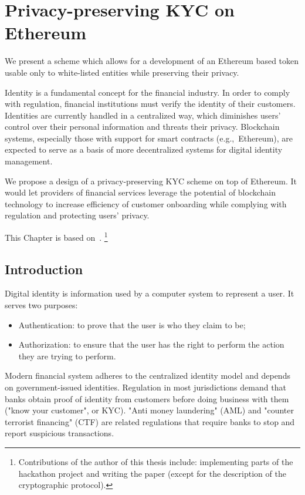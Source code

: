 \chapter{Privacy-preserving KYC on Ethereum}

\label{Chapter12KYC}

We present a scheme which allows for a development of an Ethereum based token usable only to white-listed entities while preserving their privacy.

Identity is a fundamental concept for the financial industry.
In order to comply with regulation, financial institutions must verify the identity of their customers.
Identities are currently handled in a centralized way, which diminishes users' control over their personal information and threats their privacy.
Blockchain systems, especially those with support for smart contracts (e.g.,~Ethereum), are expected to serve as a basis of more decentralized systems for digital identity management.

We propose a design of a privacy-preserving KYC scheme on top of Ethereum.
It would let providers of financial services leverage the potential of blockchain technology to increase efficiency of customer onboarding while complying with regulation and protecting users' privacy.

This Chapter is based on~\cite{Biryukov2018}.
\footnote{Contributions of the author of this thesis include: implementing parts of the hackathon project and writing the paper (except for the description of the cryptographic protocol).}



\section{Introduction}

Digital identity is information used by a computer system to represent a user.
It serves two purposes:

\begin{itemize}
	\item Authentication: to prove that the user is who they claim to be;
	\item Authorization: to ensure that the user has the right to perform the action they are trying to perform.
\end{itemize}

Modern financial system adheres to the centralized identity model and depends on government-issued identities.
Regulation in most jurisdictions demand that banks obtain proof of identity from customers before doing business with them ("know your customer", or KYC).
"Anti money laundering" (AML) and "counter terrorist financing" (CTF) are related regulations that require banks to stop and report suspicious transactions.

